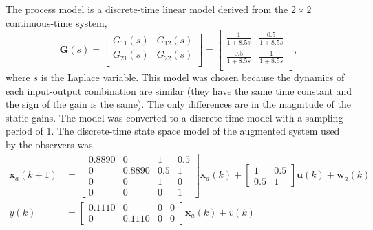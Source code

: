 The process model is a discrete-time linear model derived from the $2\times2$ continuous-time system,
\begin{equation} \label{eq:sim-sys-mimo-ct}
	\mathbf{G}(s) = \left[\begin{array}{cc}
		G_{11}(s) & G_{12}(s)  \\
		G_{21}(s) & G_{22}(s)  \\
	\end{array}\right] = \left[\begin{array}{cc}
		\frac{1}{1+8.5s} & \frac{0.5}{1+8.5s}  \\
		\frac{0.5}{1+8.5s} & \frac{1}{1+8.5s}  \\
	\end{array}\right],
\end{equation}
where $s$ is the Laplace variable.  This model was chosen because the dynamics of each input-output combination are similar (they have the same time constant and the sign of the gain is the same). The only differences are in the magnitude of the static gains. The model was converted to a discrete-time model with a sampling period of 1. The discrete-time state space model of the augmented system used by the observers was
\begin{equation} \label{eq:sim-sys-2x2-ss-aug}
	\begin{split}
		\mathbf{x}_{a}(k+1) & =\left[\begin{array}{cccc}
			0.8890 & 0 & 1 & 0.5 \\
			0 & 0.8890 & 0.5 & 1 \\
			0 & 0 & 1 & 0 \\
			0 & 0 & 0 & 1
		\end{array}\right] \mathbf{x}_{a}(k) + \left[\begin{array}{cc}
			1 & 0.5 \\
			0.5 & 1
		\end{array}\right] \mathbf{u}(k) + \mathbf{w}_{a}(k) \\
		y(k) & =\left[\begin{array}{cccc}
			0.1110 & 0 & 0 & 0 \\
			0 & 0.1110 & 0 & 0
		\end{array}\right] \mathbf{x}_{a}(k) + v(k)
	\end{split}
\end{equation}

